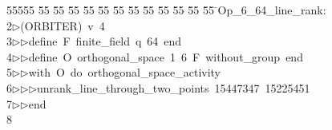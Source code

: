 %
%
\begin{tabbing}
55555 \= 55 \= 55 \= 55 \= 55 \= 55 \= 55 \= 55 \= 55 \= 55 \= 55 \= 55 \= 55 \= \>Op\_6\_64\_line\_rank:\\[0pt]
2\>$\triangleright$\>(ORBITER)\ v\ 4\ \\[0pt]
3\>$\triangleright$\>$\triangleright$\>define\ F\ finite\_field\ q\ 64\ end\ \\[0pt]
4\>$\triangleright$\>$\triangleright$\>define\ O\ orthogonal\_space\ 1\ 6\ F\ without\_group\ end\ \\[0pt]
5\>$\triangleright$\>$\triangleright$\>with\ O\ do\ orthogonal\_space\_activity\ \\[0pt]
6\>$\triangleright$\>$\triangleright$\>$\triangleright$\>unrank\_line\_through\_two\_points\ 15447347\ 15225451\ \\[0pt]
7\>$\triangleright$\>$\triangleright$\>end\\[0pt]
8\>\end{tabbing}
